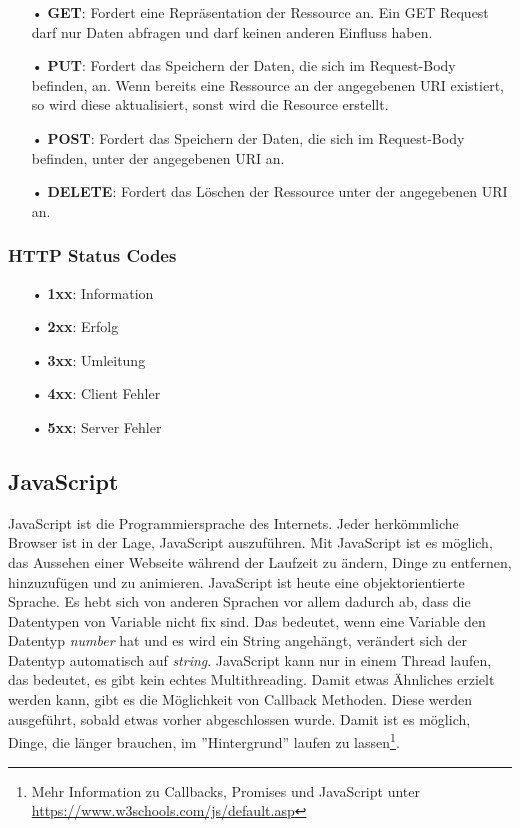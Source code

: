 \begin{itemize}
\item[•] \textbf{GET}: Fordert eine Repräsentation der Ressource an. Ein GET Request darf nur Daten abfragen und darf keinen anderen Einfluss haben.
\item[•] \textbf{PUT}: Fordert das Speichern der Daten, die sich im Request-Body befinden, an. Wenn bereits eine Ressource an der angegebenen \ac{URI} existiert, so wird diese aktualisiert, sonst wird die Resource erstellt.
\item[•] \textbf{POST}: Fordert das Speichern der Daten, die sich im Request-Body befinden, unter der angegebenen \ac{URI} an. 
\item[•] \textbf{DELETE}: Fordert das Löschen der Ressource unter der angegebenen \ac{URI} an.
\end{itemize}

\subsubsection{HTTP Status Codes}
\label{sec:http-status-codes}
\begin{itemize}
\item[•] \textbf{1xx}: Information
\item[•] \textbf{2xx}: Erfolg
\item[•] \textbf{3xx}: Umleitung
\item[•] \textbf{4xx}: Client Fehler
\item[•] \textbf{5xx}: Server Fehler
\end{itemize}

\subsection{JavaScript}
\label{sec:vor-js}
JavaScript ist die Programmiersprache des Internets. Jeder herkömmliche Browser ist in der Lage, JavaScript auszuführen. Mit JavaScript ist es möglich, das Aussehen einer Webseite während der Laufzeit zu ändern, Dinge zu entfernen, hinzuzufügen und zu animieren. JavaScript ist heute eine objektorientierte Sprache. Es hebt sich von anderen Sprachen vor allem dadurch ab, dass die Datentypen von Variable nicht fix sind. Das bedeutet, wenn eine Variable den Datentyp \textit{number} hat und es wird ein String angehängt, verändert sich der Datentyp automatisch auf \textit{string}. JavaScript kann nur in einem Thread laufen, das bedeutet, es gibt kein echtes Multithreading. Damit etwas Ähnliches erzielt werden kann, gibt es die Möglichkeit von Callback Methoden. Diese werden ausgeführt, sobald etwas vorher abgeschlossen wurde. Damit ist es möglich, Dinge, die länger brauchen, im ''Hintergrund'' laufen zu lassen\footnote{Mehr Information zu Callbacks, Promises und JavaScript unter \url{https://www.w3schools.com/js/default.asp}}.

